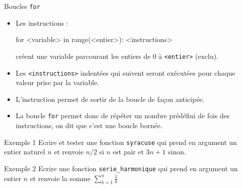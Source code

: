 \documentclass[10pt]{beamer}
\begin{document}
\begin{frame}[fragile]{\Ctitle}{\stitle}
	\begin{alertblock}{Boucles {\tt for}}
		\begin{itemize}
			\item<2-> Les instructions :
			      \begin{codepython}
	for <variable> in range(<entier>):
		 <instructions>
	\end{codepython}
			      créent une variable parcourant les entiers de 0 à {\tt <entier>} (exclu).
			\item<3-> Les {\tt <instructions>} indentées qui suivent seront exécutées pour chaque valeur prise par la variable.
			\item<4-> L'instruction  permet de sortir de la boucle de façon anticipée.
			\item<5-> La boucle {\tt for} permet donc de répéter un nombre prédéfini de fois des instructions, on dit que c'est une boucle bornée.
		\end{itemize}
	\end{alertblock}
\end{frame}


\begin{frame}[fragile]{\Ctitle}{\stitle}
	\begin{exampleblock}{Exemple 1}
		Ecrire et tester une fonction {\tt syracuse} qui prend en argument un entier naturel $n$ et renvoie $n/2$ si $n$ est pair et $3n+1$ sinon. \\
		\onslide<2->
	\end{exampleblock}
\end{frame}

\begin{frame}[fragile]{\Ctitle}{\stitle}
	\begin{exampleblock}{Exemple 2}
		Ecrire une fonction {\tt serie\_harmonique} qui prend en argument un entier $n$ et renvoie la somme $\displaystyle{\sum_{k=1}^n \frac{1}{k}}$
		\onslide<2->
	\end{exampleblock}
\end{frame}
\end{document}
